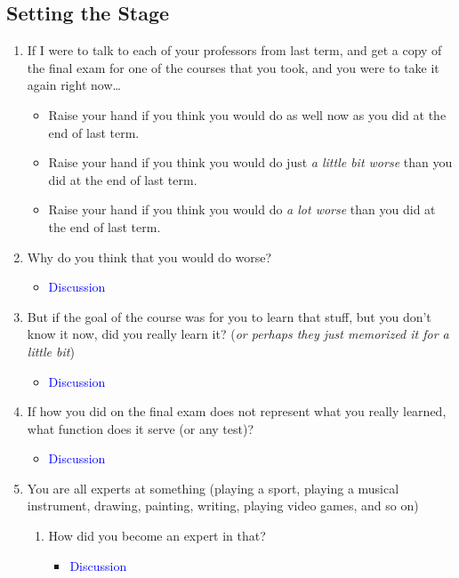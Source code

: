 \documentclass[hidelinks]{article}
\begin{document}
	\subsection{Setting the Stage}
		\begin{enumerate}
			\item If I were to talk to each of your professors from last term, and get a copy of the final exam for one of the courses that you took, and you were to take it again right now\ldots
				\begin{itemize}
					\item Raise your hand if you think you would do as well now as you did at the end of last term.
					\item Raise your hand if you think you would do just \emph{\textcolor{smured}{a little bit worse}} than you did at the end of last term.
					\item Raise your hand if you think you would do \emph{\textcolor{smured}{a lot worse}} than you did at the end of last term.
				\end{itemize}

			\item Why do you think that you would do worse?
				\begin{itemize}
					\item \textcolor{blue}{Discussion}
				\end{itemize}

			\item But if the goal of the course was for you to learn that stuff, but you don't know it now, did you really learn it? (\emph{or perhaps they just memorized it for a little bit})
				\begin{itemize}
					\item \textcolor{blue}{Discussion}
				\end{itemize}

			\item If how you did on the final exam does not represent what you really learned, what function does it serve (or any test)?
				\begin{itemize}
					\item \textcolor{blue}{Discussion}
				\end{itemize}

			\item You are all experts at something (playing a sport, playing a musical instrument, drawing, painting, writing, playing video games, and so on)
				\begin{enumerate}
					\item How did you become an expert in that?
						\begin{itemize}
							\item \textcolor{blue}{Discussion}
						\end{itemize}


\end{enumerate}
\end{enumerate}
\end{document}
